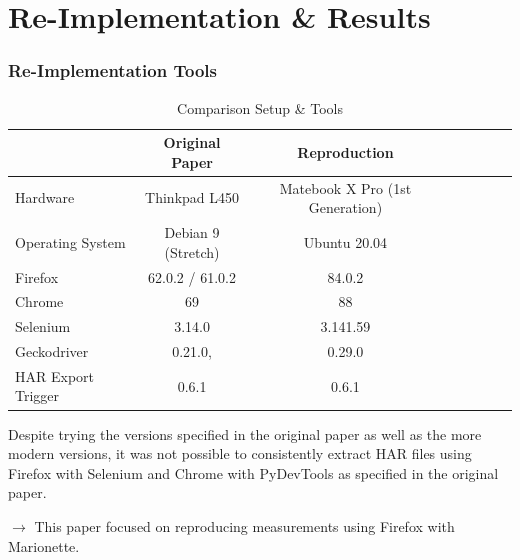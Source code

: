 \section{Re-Implementation \& Results}

\begin{frame}
    \frametitle{Re-Implementation Tools}
	\begin{table}
		\centering
		\caption{Comparison Setup \& Tools}
		\label{tab:tools}
		\begin{tabular}{lccccccc}
			\toprule
			& \textbf{Original Paper} & \textbf{Reproduction}\\
			\midrule
			Hardware & Thinkpad L450 & Matebook X Pro (1st Generation)\\
			Operating System & Debian 9 (Stretch) & Ubuntu 20.04\\
			Firefox & 62.0.2 / 61.0.2 & 84.0.2 \\
			Chrome & 69 & 88 \\
			Selenium & 3.14.0 & 3.141.59\\
			Geckodriver & 0.21.0, & 0.29.0\\
			HAR Export Trigger & 0.6.1 & 0.6.1\\
			\bottomrule
		\end{tabular}
	\end{table}
	
Despite trying the versions specified in the original paper as well as the more modern versions, it was not possible to consistently extract HAR files using Firefox with Selenium and Chrome with PyDevTools as specified in the original paper.

$\boldsymbol{\rightarrow}$  This paper focused on reproducing measurements using Firefox with Marionette.
\end{frame}

